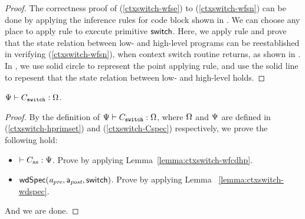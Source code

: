 {\begin{proof}
    The correctness proof of
    (\ref{ctxswitch-wfse}) to (\ref{ctxswitch-wfsn}) 
    can be done by applying the inference rules for 
    code block shown in 
    \Fig{\ref{fig:Selected Inference Rules for Refinement Verification}}. 
    We can choose any place to apply 
     rule to execute primitive $\mathsf{switch}$. 
    Here, we apply  rule 
    and prove that the state 
    relation between low- and high-level programs 
    can be reestablished in verifying 
    (\ref{ctxswitch-wfsn}), when context switch routine 
    returns, as shown in \Fig{\ref{fig:refinement reasoning}}.
    In \Fig{\ref{fig:refinement reasoning}}, we use 
    solid circle to represent the point applying  rule, 
    and use the solid line to repesent that the state relation 
    between low- and high-level holds. 
\end{proof}

\begin{theorem}
    \em
    ${\Psi} \vdash {C_{\texttt{switch}}} : {\Omega}$. 
\end{theorem}
\begin{proof}
    By the definition of 
    ${\Psi} \vdash {C_{\texttt{switch}}} : {\Omega}$, 
    where $\Omega$ and $\Psi{}$ are defined in 
    (\ref{ctxswitch-hprimset}) and (\ref{ctxswitch-Cspec}) 
    respectively, we prove the following hold:
    \begin{itemize}
        \item $\vdash {C_{\text{as}}} : {\Psi{}}$. 
            Prove by applying Lemma~\ref{lemma:ctxswitch-wfcdhp}.
        \item $\textsf{wdSpec}({\textit{a}_\textit{pre}}, {\mathsf{a}_{\textit{post}}}, {\mathsf{switch}})$.
            Prove by applying Lemma ~\ref{lemma:ctxswitch-wdspec}.
    \end{itemize}
    And we are done.
\end{proof}

}
